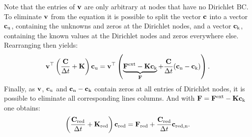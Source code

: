   Note that the entries of ${\bf{v}}$ are only arbitrary at nodes that have no Dirichlet BC. To eliminate ${\bf{v}}$ from the equation it is possible to split the vector ${\bf{c}}$ into a vector ${\bf{c}}_{\rm u}$, containing the unknowns and zeros at the Dirichlet nodes, and a vector ${\bf{c}}_{\rm k}$, containing the known values at the Dirichlet nodes and zeros everywhere else. Rearranging then yields:
  \begin{equation}
    {\bf{v}}^{\top} \left( \frac{{\bf{C}}}{\Delta t}+{\bf{K}}\right) {\bf{c}}_{\rm u} = {\bf{v}}^{\top} \left( \underbrace{{\bf{F}}^{\rm ext} - {\bf{K}} {\bf{c}}_{\rm k}}_{{\bf{F}}} +\frac{{\bf{C}}}{\Delta t}({\bf{c}}_{\rm n}-{\bf{c}}_{\rm k})  \right).
  \end{equation}
  Finally, as ${\bf{v}}$, ${\bf{c}}_{\rm u}$ and ${\bf{c}}_{\rm n}-{\bf{c}}_{\rm k}$ contain zeros at all entries of Dirichlet nodes, it is possible to eliminate all corresponding lines columns. And with ${\bf{F}} = {\bf{F}}^{\rm ext} - {\bf{K}}{\bf{c}}_{\rm k}$ one obtains:
  \begin{equation}
    \left(\frac{{\bf{C}}_{\rm red}}{\Delta t}+{\bf{K}}_{\rm red}\right) {\bf{c}}_{\rm red} = {\bf{F}}_{\rm red} + \frac{{\bf{C}}_{\rm red}}{\Delta t} {\bf{c}}_{\rm red,n}.
  \end{equation} 
  


